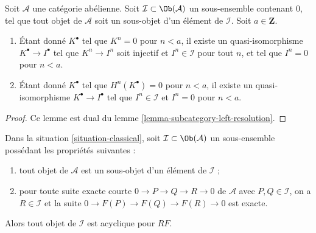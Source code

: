\begin{lemma}
\label{lemma-subcategory-right-resolution}
Soit $\mathcal{A}$ une catégorie abélienne. Soit
$\mathcal{I} \subset \Ob(\mathcal{A})$ un sous-ensemble contenant $0$, tel
que tout objet de $\mathcal{A}$ soit un sous-objet d'un élément de
$\mathcal{I}$. Soit $a \in \mathbf{Z}$.
\begin{enumerate}
\item Étant donné $K^\bullet$ tel que $K^n = 0$ pour $n < a$, il existe un
quasi-isomorphisme $K^\bullet \to I^\bullet$ tel que
$K^n \to I^n$ soit injectif et $I^n \in \mathcal{I}$ pour tout $n$, et tel
que $I^n = 0$ pour $n < a$.
\item Étant donné $K^\bullet$ tel que $H^n(K^\bullet) = 0$ pour $n < a$, il
existe un quasi-isomorphisme $K^\bullet \to I^\bullet$ tel que
$I^n \in \mathcal{I}$ et $I^n = 0$ pour $n < a$.
\end{enumerate}
\end{lemma}

\begin{proof}
Ce lemme est dual du lemme \ref{lemma-subcategory-left-resolution}.
\end{proof}

\begin{lemma}
\label{lemma-subcategory-right-acyclics}
Dans la situation \ref{situation-classical}, soit
$\mathcal{I} \subset \Ob(\mathcal{A})$ un sous-ensemble possédant les
propriétés suivantes :
\begin{enumerate}
\item tout objet de $\mathcal{A}$ est un sous-objet d'un élément de
$\mathcal{I}$ ;
\item pour toute suite exacte courte $0 \to P \to Q \to R \to 0$ de
$\mathcal{A}$ avec $P, Q \in \mathcal{I}$, on a $R \in \mathcal{I}$ et la
suite $0 \to F(P) \to F(Q) \to F(R) \to 0$ est exacte.
\end{enumerate}
Alors tout objet de $\mathcal{I}$ est acyclique pour $RF$.
\end{lemma}

